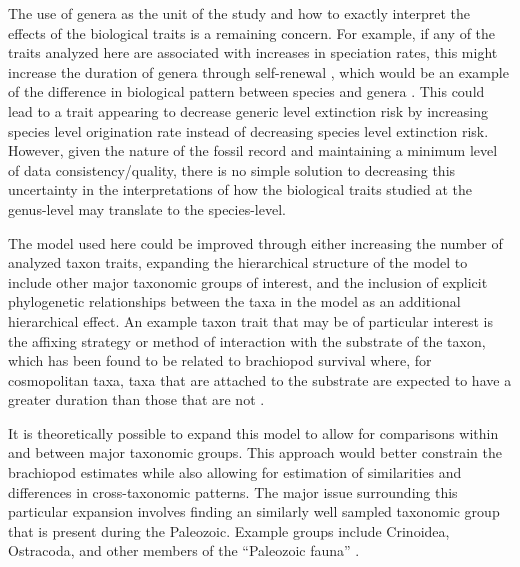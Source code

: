 \documentclass{article}
\begin{document}
The use of genera as the unit of the study and how to exactly interpret the effects of the biological traits is a remaining concern. For example, if any of the traits analyzed here are associated with increases in speciation rates, this might increase the duration of genera through self-renewal \citep{Raup1991b,Raup1994}, which would be an example of the difference in biological pattern between species and genera \citep{Jablonski1987,Jablonski2007,Jablonski2008a}. This could lead to a trait appearing to decrease generic level extinction risk by increasing species level origination rate instead of decreasing species level extinction risk. However, given the nature of the fossil record and maintaining a minimum level of data consistency/quality, there is no simple solution to decreasing this uncertainty in the interpretations of how the biological traits studied at the genus-level may translate to the species-level.

The model used here could be improved through either increasing the number of analyzed taxon traits, expanding the hierarchical structure of the model to include other major taxonomic groups of interest, and the inclusion of explicit phylogenetic relationships between the taxa in the model as an additional hierarchical effect. An example taxon trait that may be of particular interest is the affixing strategy or method of interaction with the substrate of the taxon, which has been found to be related to brachiopod survival where, for cosmopolitan taxa, taxa that are attached to the substrate are expected to have a greater duration than those that are not \citep{Alexander1977}.

It is theoretically possible to expand this model to allow for comparisons within and between major taxonomic groups. This approach would better constrain the brachiopod estimates while also allowing for estimation of similarities and differences in cross-taxonomic patterns. The major issue surrounding this particular expansion involves finding an similarly well sampled taxonomic group that is present during the Paleozoic. Example groups include Crinoidea, Ostracoda, and other members of the ``Paleozoic fauna'' \citep{Sepkoski1981a}.
\end{document}
